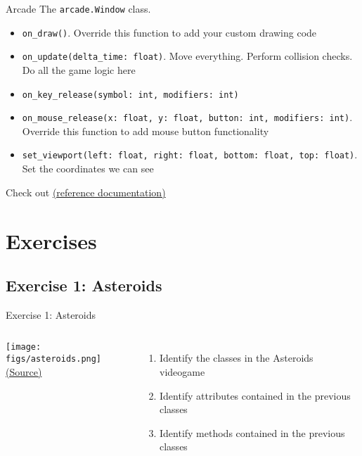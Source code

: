\documentclass[10pt,compress]{beamer} %
\begin{document}
\begin{frame}{Arcade}
	The \texttt{arcade.Window} class.

	\begin{block}{}
		\begin{itemize}
		\item \footnotesize{\texttt{on\_draw()}}. Override this function to add your custom drawing code
		\item \footnotesize{\texttt{on\_update(delta\_time: float)}}. Move everything. Perform collision checks. Do all the game logic here
		\item \footnotesize{\texttt{on\_key\_release(symbol: int, modifiers: int)}} 
		\item \footnotesize{\texttt{on\_mouse\_release(x: float, y: float, button: int, modifiers: int)}}. Override this function to add mouse button functionality
		\item \footnotesize{\texttt{set\_viewport(left: float, right: float, bottom: float, top: float)}}. Set the coordinates we can see
		\end{itemize}
	\end{block}	

	Check out \href{https://api.arcade.academy/en/stable/api/window.html\#arcade-window}{(reference documentation)}
\end{frame}

\section{Exercises}
\subsection{Exercise 1: Asteroids}
	\begin{frame}{Exercise 1: Asteroids}
	\vspace{-0.3cm}
    \begin{columns}
		\centering \texttt{[image: figs/asteroids.png]}\\
		\tiny{\href{http://gamedevelopment.tutsplus.com/tutorials/quick-tip-intro-to-object-oriented-programming-for-game-development--gamedev-1805}{(Source)}}
	\begin{enumerate}
	\item Identify the classes in the Asteroids videogame
	\item Identify attributes contained in the previous classes
	\item Identify methods contained in the previous classes
	\end{enumerate}
	\end{columns}
\end{frame}
\end{document}
